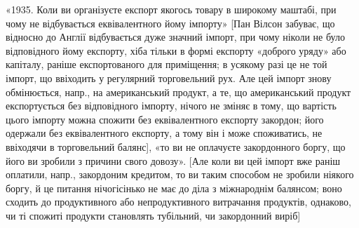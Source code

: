 «1935. Коли ви організуєте експорт якогось товару в широкому маштабі,
при чому не відбувається еквівалентного йому імпорту» [Пан Вілсон забуває,
що відносно до Англії відбувається дуже значний імпорт, при чому ніколи не
було відповідного йому експорту, хіба тільки в формі експорту «доброго уряду»
або капіталу, раніше експортованого для приміщення; в усякому разі це не той
імпорт, що ввіходить у регулярний торговельний рух. Але цей імпорт знову
обмінюється, напр., на американський продукт, а те, що американський
продукт експортується без відповідного імпорту, нічого не зміняє в тому, що
вартість цього імпорту можна спожити без еквівалентного експорту закордон;
його одержали без еквівалентного експорту, а тому він і може споживатись, не
ввіходячи в торговельний балянс], «то ви не оплачуєте закордонного боргу, що
його ви зробили з причини свого довозу». [Але коли ви цей імпорт вже
раніш оплатили, напр., закордоним кредитом, то ви таким способом не зробили
ніякого боргу, й це питання нічогісінько не має до діла з міжнароднім балянсом;
воно сходить до продуктивного або непродуктивного витрачання продуктів,
однаково, чи ті спожиті продукти становлять тубільний, чи закордонний виріб]
\parbreak{}  %
